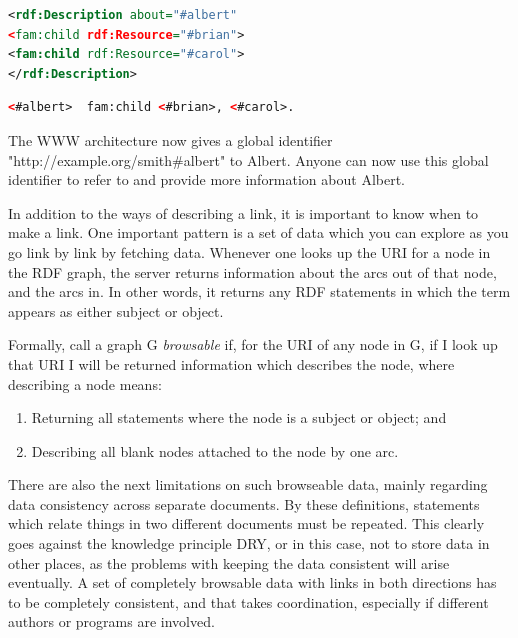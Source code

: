 \documentclass[thesis=M,english,hidelinks]{FITthesis}[2019/12/23]
\begin{document}
\begin{lstlisting}[language=XML, caption=Example of RDF serialization in XML, label = {lst:rdf-xml-example}]
<rdf:Description about="#albert"
<fam:child rdf:Resource="#brian">
<fam:child rdf:Resource="#carol">
</rdf:Description>
\end{lstlisting}


\begin{lstlisting}[language=XML, caption=Example of RDF serialization in N3/Turtle, label = {lst:rdf-turtle-example}]
	<#albert>  fam:child <#brian>, <#carol>.
\end{lstlisting}

The \gls{WWW} architecture now gives a global identifier  "http://example.org/smith\#albert" to Albert. Anyone can now use this global identifier to refer to and provide more information about Albert.

In addition to the ways of describing a link, it is important to know when to make a link. One important pattern is a set of data which you can explore as you go link by link by fetching data.   Whenever one looks up the \gls{URI} for a node in the RDF graph, the server returns information about the arcs out of that node, and the arcs in.  In other words, it returns any RDF statements in which the term appears as either subject or object.

Formally, call a graph G \textit{browsable} if, for  the \gls{URI} of any node in G, if I look up that \gls{URI} I will be returned information which describes the node, where describing a node means:
\begin{enumerate}
	\item Returning all statements where the node is a subject or object; and
	\item Describing all blank nodes attached to the node by one arc.
\end{enumerate}

There are also the next limitations on such browseable data, mainly regarding data consistency across separate documents. By these definitions, statements which relate things in two different documents must be repeated. This clearly goes against the knowledge principle \gls{DRY}, or in this case, not to store data in other places, as the problems with keeping the data consistent will arise eventually. A set of completely browsable data with links in both directions has to be completely consistent, and that takes coordination, especially if different authors or programs are involved.
\end{document}
